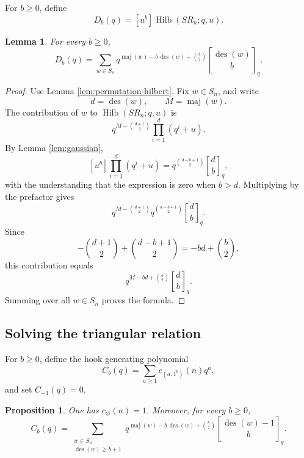 \documentclass[12pt]{article}
\newtheorem{lemma}[theorem]{Lemma}
\newtheorem{proposition}[theorem]{Proposition}
\DeclareMathOperator{\Hilb}{Hilb}
\DeclareMathOperator{\des}{des}
\DeclareMathOperator{\maj}{maj}
\newcommand{\qbinom}[2]{\genfrac{[}{]}{0pt}{}{#1}{#2}_q}
\begin{document}
For \(b\ge 0\), define
\[
D_b(q)=[u^b]\Hilb(SR_n;q,u).
\]

\begin{lemma}\label{lem:Db}
For every \(b\ge 0\),
\[
D_b(q)
=
\sum_{w\in S_n}
q^{\maj(w)-b\,\des(w)+\binom{b}{2}}
\qbinom{\des(w)}{b}.
\]
\end{lemma}

\begin{proof}
Use Lemma \ref{lem:permutation-hilbert}.  Fix \(w\in S_n\), and write
\[
d=\des(w),\qquad M=\maj(w).
\]
The contribution of \(w\) to \(\Hilb(SR_n;q,u)\) is
\[
q^{M-\binom{d+1}{2}}\prod_{i=1}^{d}(q^i+u).
\]
By Lemma \ref{lem:gaussian},
\[
[u^b]\prod_{i=1}^{d}(q^i+u)
=
q^{\binom{d-b+1}{2}}\qbinom{d}{b},
\]
with the understanding that the expression is zero when \(b>d\).  Multiplying by the prefactor gives
\[
q^{M-\binom{d+1}{2}}
q^{\binom{d-b+1}{2}}
\qbinom{d}{b}.
\]
Since
\[
-\binom{d+1}{2}+\binom{d-b+1}{2}
=
-bd+\binom{b}{2},
\]
this contribution equals
\[
q^{M-bd+\binom{b}{2}}\qbinom{d}{b}.
\]
Summing over all \(w\in S_n\) proves the formula.
\end{proof}

\subsection{Solving the triangular relation}

For \(b\ge 0\), define the hook generating polynomial
\[
C_b(q)=\sum_{a\ge 1}c_{(a,1^b)}(n)q^a,
\]
and set \(C_{-1}(q)=0\).

\begin{proposition}\label{prop:Cb}
One has \(c_{\varnothing}(n)=1\).  Moreover, for every \(b\ge 0\),
\[
C_b(q)
=
\sum_{\substack{w\in S_n\\ \des(w)\ge b+1}}
q^{\maj(w)-b\,\des(w)+\binom{b}{2}}
\qbinom{\des(w)-1}{b}.
\]
\end{proposition}
\end{document}
